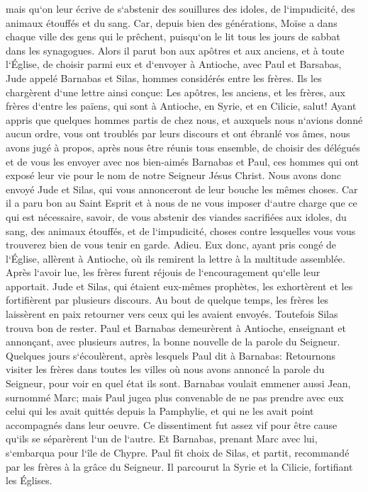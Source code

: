 \verse mais qu`on leur écrive de s`abstenir des souillures des idoles, de l`impudicité, des animaux étouffés et du sang. 
\verse Car, depuis bien des générations, Moïse a dans chaque ville des gens qui le prêchent, puisqu`on le lit tous les jours de sabbat dans les synagogues. 
\verse Alors il parut bon aux apôtres et aux anciens, et à toute l`Église, de choisir parmi eux et d`envoyer à Antioche, avec Paul et Barsabas, Jude appelé Barnabas et Silas, hommes considérés entre les frères. 
\verse Ils les chargèrent d`une lettre ainsi conçue: Les apôtres, les anciens, et les frères, aux frères d`entre les païens, qui sont à Antioche, en Syrie, et en Cilicie, salut! 
\verse Ayant appris que quelques hommes partis de chez nous, et auxquels nous n`avions donné aucun ordre, vous ont troublés par leurs discours et ont ébranlé vos âmes, 
\verse nous avons jugé à propos, après nous être réunis tous ensemble, de choisir des délégués et de vous les envoyer avec nos bien-aimés Barnabas et Paul, 
\verse ces hommes qui ont exposé leur vie pour le nom de notre Seigneur Jésus Christ. 
\verse Nous avons donc envoyé Jude et Silas, qui vous annonceront de leur bouche les mêmes choses. 
\verse Car il a paru bon au Saint Esprit et à nous de ne vous imposer d`autre charge que ce qui est nécessaire, 
\verse savoir, de vous abstenir des viandes sacrifiées aux idoles, du sang, des animaux étouffés, et de l`impudicité, choses contre lesquelles vous vous trouverez bien de vous tenir en garde. Adieu. 
\verse Eux donc, ayant pris congé de l`Église, allèrent à Antioche, où ils remirent la lettre à la multitude assemblée. 
\verse Après l`avoir lue, les frères furent réjouis de l`encouragement qu`elle leur apportait. 
\verse Jude et Silas, qui étaient eux-mêmes prophètes, les exhortèrent et les fortifièrent par plusieurs discours. 
\verse Au bout de quelque temps, les frères les laissèrent en paix retourner vers ceux qui les avaient envoyés. 
\verse Toutefois Silas trouva bon de rester. 
\verse Paul et Barnabas demeurèrent à Antioche, enseignant et annonçant, avec plusieurs autres, la bonne nouvelle de la parole du Seigneur. 
\verse Quelques jours s`écoulèrent, après lesquels Paul dit à Barnabas: Retournons visiter les frères dans toutes les villes où nous avons annoncé la parole du Seigneur, pour voir en quel état ils sont. 
\verse Barnabas voulait emmener aussi Jean, surnommé Marc; 
\verse mais Paul jugea plus convenable de ne pas prendre avec eux celui qui les avait quittés depuis la Pamphylie, et qui ne les avait point accompagnés dans leur oeuvre. 
\verse Ce dissentiment fut assez vif pour être cause qu`ils se séparèrent l`un de l`autre. Et Barnabas, prenant Marc avec lui, s`embarqua pour l`île de Chypre. 
\verse Paul fit choix de Silas, et partit, recommandé par les frères à la grâce du Seigneur. 
\verse Il parcourut la Syrie et la Cilicie, fortifiant les Églises. 

